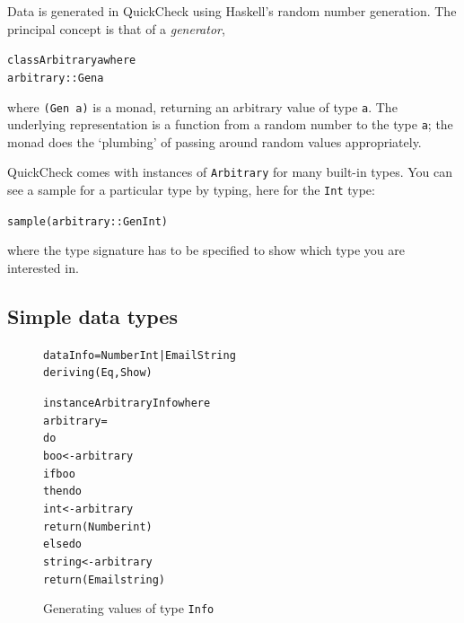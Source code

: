 Data is generated in QuickCheck using Haskell's random number generation. The principal concept is that of a \emph{generator},
\begin{alltt}
class Arbitrary a where
  arbitrary :: Gen a
\end{alltt}
where \texttt{(Gen a)} is a monad, returning an arbitrary value of type \texttt{a}. The underlying representation is a function from a random number to the type \texttt{a}; the monad does the `plumbing' of passing around random values appropriately.

QuickCheck comes with instances of \texttt{Arbitrary} for many built-in types. You can see a sample for a particular type by typing, here for the \texttt{Int} type:
\begin{alltt}
sample (arbitrary :: Gen Int)
\end{alltt} 
where the type signature has to be specified to show which type you are interested in.

\subsection*{Simple data types}

\begin{figure}[t] 
\begin{center}
\begin{alltt}
data Info = Number Int | Email String
            deriving (Eq, Show)

instance Arbitrary Info where
    arbitrary =
        do
          boo <- arbitrary
          if boo
            then do
              int <- arbitrary
              return (Number int) 
            else do
              string <- arbitrary
              return (Email string)
\end{alltt}
\end{center}
\caption{Generating values of type \texttt{Info}}
\label{InfoQC}
\end{figure}



